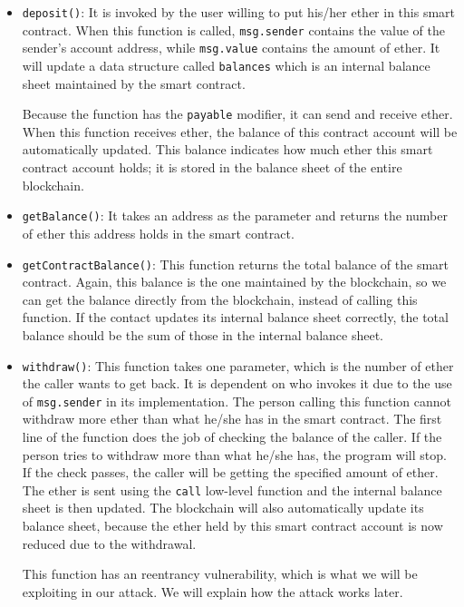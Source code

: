 \begin{itemize}
\item \texttt{deposit()}: It is invoked by the user willing to put his/her 
  ether in this smart contract. When this function is called, 
  \texttt{msg.sender} contains the value of the sender's account address, 
  while \texttt{msg.value} contains the amount of ether. 
  It will update a data structure called \texttt{balances} which
  is an internal balance sheet maintained by the smart contract. 

  Because the function has the \texttt{payable} modifier, it 
  can send and receive ether. When this function receives 
  ether, the balance of this contract account 
  will be automatically updated. This balance indicates how much
  ether this smart contract account holds; it is stored
  in the balance sheet of the entire blockchain. 


\item \texttt{getBalance()}: 
  It takes an address as the parameter and returns the number of ether
  this address holds in the smart contract. 

\item \texttt{getContractBalance()}: 
  This function returns the total balance of the smart contract.
  Again, this balance is the one maintained by the blockchain,
  so we can get the balance directly from the blockchain, instead 
  of calling this function. 
  If the contact updates its internal balance sheet correctly,
  the total balance should be the sum of those in the internal
  balance sheet.


\item \texttt{withdraw()}: 
  This function takes one parameter, which is the number of ether the caller 
  wants to get back. It is dependent on who invokes it due to the use of 
  \texttt{msg.sender} in its implementation. The person calling this function cannot withdraw
  more ether than what he/she has in the smart contract. The first line 
  of the function does the job of checking the balance of the caller. 
  If the person tries to withdraw more than what he/she has, the program will stop. 
  If the check passes, the caller will be getting the specified amount of ether. 
  The ether is sent using the \texttt{call} low-level function and the 
  internal balance sheet is then updated. The blockchain will also automatically
  update its balance sheet, because the ether held by this smart contract
  account is now reduced due to the withdrawal. 

  This function has an reentrancy vulnerability, which is what we will be 
  exploiting in our attack. We will explain how the attack works later.  
\end{itemize}


